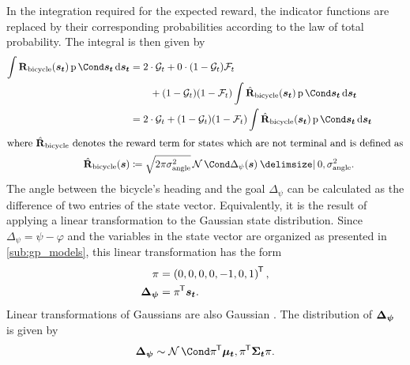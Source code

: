 In the integration required for the expected reward, the indicator functions are replaced by their corresponding probabilities according to the law of total probability.
The integral is then given by
\begin{align}
    \int \RwdBicycle(\rv{s_t}) \Prob{\rv{s_t}} \diff \rv{s_t} &= 2 \cdot \PGoal_t + 0 \cdot (1 - \PGoal_t) \PFallen_t \\
    &\qquad + (1 - \PGoal_t)(1 - \PFallen_t) \int \RwdBicycleHat(\rv{s_t}) \Prob{\rv{s_t}} \diff \rv{s_t} \\
    &= 2 \cdot \PGoal_t + (1 - \PGoal_t)(1 - \PFallen_t) \int \RwdBicycleHat(\rv{s_t}) \Prob{\rv{s_t}} \diff \rv{s_t} \\
    \intertext{where $\RwdBicycleHat$ denotes the reward term for states which are not terminal and is defined as}
    \RwdBicycleHat(\rv{s}) &\coloneqq \sqrt{2\pi\sigma_{\text{angle}}^2} \Gaussian{\Delta_\psi(\rv{s}) \given 0, \sigma_{\text{angle}}^2}.
\end{align}
The angle between the bicycle's heading and the goal $\Delta_\psi$ can be calculated as the difference of two entries of the state vector.
Equivalently, it is the result of applying a linear transformation to the Gaussian state distribution.
Since $\Delta_\psi = \psi - \varphi$ and the variables in the state vector are organized as presented in \cref{sub:gp_models}, this linear transformation has the form
\begin{align}
    \pi &= \left( 0, 0, 0, 0, -1, 0, 1 \right)\tran, \\
    \rv{\Delta_\psi} &= \pi\tran \rv{s_t}.
\end{align}
Linear transformations of Gaussians are also Gaussian \cite{petersen_matrix_2008}.
The distribution of $\bm{\Delta_\psi}$ is given by
\begin{align}
    \rv{\Delta_\psi} \sim \Gaussian{\pi\tran\mat{\mu_t}, \pi\tran \mat{\Sigma_t} \pi}.
\end{align}

